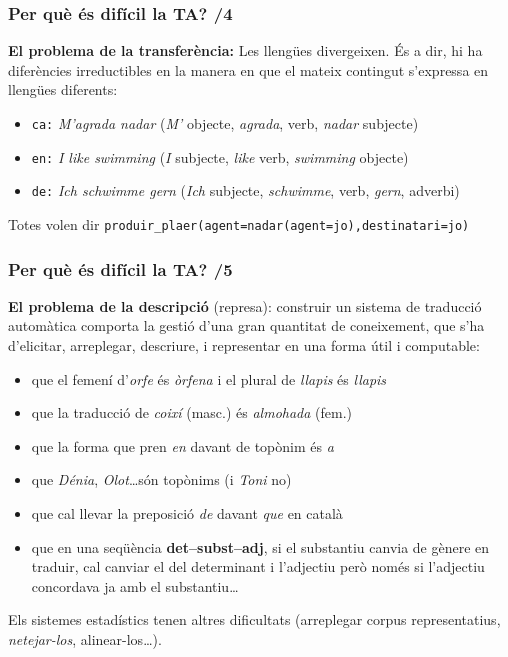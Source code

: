 \documentclass{beamer}
\newcommand{\empha}[1]{\emph{#1}\/}
\begin{document}
\begin{frame}
  \frametitle{ Per què és difícil la TA? /4} 
  
  \textbf{El problema de la transferència:} Les llengües divergeixen. És a
  dir, hi ha diferències irreductibles en la manera en que el mateix contingut
  s'expressa en llengües diferents:
  \begin{itemize}\itemsep 0ex
  \item \texttt{ca:} \empha{M'agrada nadar} (\empha{M'} objecte, \empha{agrada},
    verb, \empha{nadar} subjecte)
  \item \texttt{en:} \empha{I like swimming} (\empha{I} subjecte, \empha{like}
  verb, 
  \empha{swimming} objecte)
  \item \texttt{de:} \empha{Ich schwimme gern} (\empha{Ich} subjecte,
  \empha{schwimme}, verb,  \empha{gern}, adverbi)
  \end{itemize}
  Totes volen dir \texttt{produir\_plaer(agent=nadar(agent=jo),destinatari=jo)}
\end{frame}


\begin{frame}
  \frametitle{ Per què és difícil la TA? /5} 
  
  \textbf{El problema de la descripció} (represa): construir un sistema de
  traducció automàtica comporta la gestió d'una gran quantitat de coneixement,
  que s'ha d'elicitar, arreplegar, descriure, i representar en una forma útil i
  computable:
  \begin{itemize}
  \item que el femení d'\empha{orfe} és \empha{òrfena} i el plural de \empha{llapis} és \empha{llapis}
  \item que la traducció de \empha{coixí} (masc.) és \empha{almohada} (fem.)
  \item que la forma que pren \empha{en}  davant de topònim és \empha{a}
  \item que \empha{Dénia}, \empha{Olot}\ldots són topònims (i \empha{Toni} no)
  \item que cal llevar la preposició \empha{de} davant \empha{que} en català
  \item que en una seqüència \textbf{det--subst--adj}, si el substantiu canvia de gènere en traduir, cal canviar el del determinant i l'adjectiu però només si l'adjectiu concordava ja amb el substantiu\ldots
  \end{itemize}
Els sistemes estadístics tenen altres dificultats (arreplegar corpus representatius, \emph{netejar-los}, alinear-los\ldots).

\end{frame}
\end{document}
